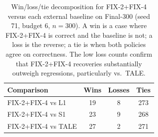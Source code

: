 \begin{table}[H]
\centering
\caption{Win/loss/tie decomposition for FIX-2+FIX-4 versus each external baseline on
Final-300 (seed 71, budget 6, $n=300$). A win is a case where FIX-2+FIX-4 is correct
and the baseline is not; a loss is the reverse; a tie is when both policies agree on
correctness. The low loss counts confirm that FIX-2+FIX-4 recoveries substantially
outweigh regressions, particularly vs.\ TALE.}
\label{tab:wlt}
\small
\begin{tabular}{lccc}
\toprule
Comparison & Wins & Losses & Ties \\
\midrule
FIX-2+FIX-4 vs L1   & 19 & 8 & 273 \\
FIX-2+FIX-4 vs S1   & 23 & 9 & 268 \\
FIX-2+FIX-4 vs TALE & 27 & 2 & 271 \\
\bottomrule
\end{tabular}
\end{table}
